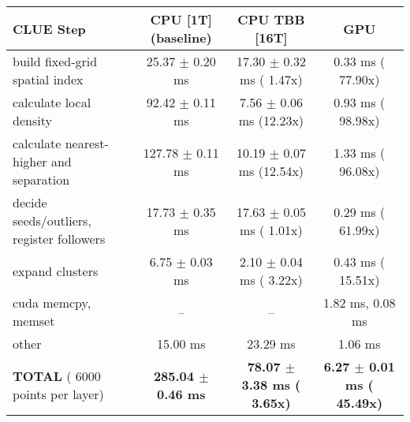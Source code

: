     \begin{tabular}{l|c|c|c}
    \hline
    CLUE Step                                 & CPU [1T] (baseline)         & CPU TBB [16T]                         & GPU                       \\ \hline
    build fixed-grid spatial index            &  25.37 $\pm$  0.20 ms       &  17.30 $\pm$  0.32 ms ( 1.47x)        &   0.33 ms ( 77.90x)       \\
    calculate local density                   &  92.42 $\pm$  0.11 ms       &   7.56 $\pm$  0.06 ms (12.23x)        &   0.93 ms ( 98.98x)       \\
    calculate nearest-higher and separation   & 127.78 $\pm$  0.11 ms       &  10.19 $\pm$  0.07 ms (12.54x)        &   1.33 ms ( 96.08x)       \\
    decide seeds/outliers, register followers &  17.73 $\pm$  0.35 ms       &  17.63 $\pm$  0.05 ms ( 1.01x)        &   0.29 ms ( 61.99x)       \\
    expand clusters                           &   6.75 $\pm$  0.03 ms       &   2.10 $\pm$  0.04 ms ( 3.22x)        &   0.43 ms ( 15.51x)       \\ \hline
    cuda memcpy, memset                       & --                          & --                                    &   1.82 ms,   0.08 ms      \\ 
    other                                     &  15.00 ms                   &  23.29 ms                             &   1.06 ms                 \\ \hline
    \textbf{TOTAL} ( 6000 points per layer)   & \textbf{285.04 $\pm$  0.46 ms} & \textbf{ 78.07 $\pm$  3.38 ms ( 3.65x)} & \textbf{  6.27 $\pm$  0.01 ms ( 45.49x)}  \\
    \hline 
    \end{tabular}
    \linebreak


